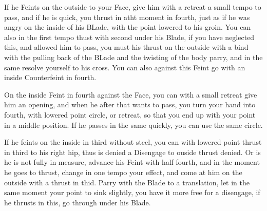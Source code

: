If he Feints on the outside to your Face, give him with a retreat a
small tempo to pass, and if he is quick, you thrust in atht moment in
fourth, just as if he was angry on the inside of his BLade, with the
point lowered to his groin. You can also in the first tempo thust with
second under his Blade, if you have neglected this, and allowed him to
pass, you must his thrust on the outside with a bind with the pulling
back of the BLade and the twisting of the body parry, and in the same
resolve yourself to his cross. You can also against this Feint go with an
inside Counterfeint in fourth.


On the inside Feint in fourth against the Face, you can with a small
retreat give him an opening, and when he after that wants to pass, you
turn your hand into fourth, with lowered point circle, or retreat, so
that you end up with your point in a middle position. If he passes in
the same quickly, you can use the same circle.


If he feints on the inside in third without steel, you can with
lowered point thrust in third to his right hip, thus is denied a
Disengage to ouside thrust denied. Or is he is not fully in measure,
advance his Feint with half fourth, and in the moment he goes to
thrust, change in one tempo your effect, and come at him on the
outside with a thrust in thid. Parry with the Blade to a translation,
let in the same moment your point to sink slightly, you have it more
free for a disengage, if he thrusts in this, go through under his Blade.
